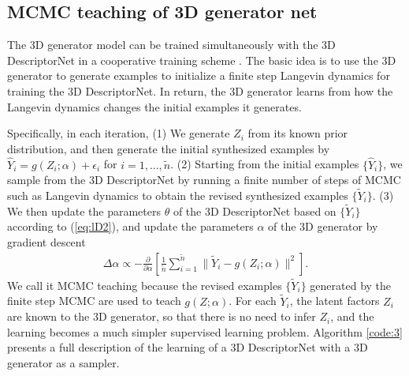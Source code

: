 \documentclass[10pt,twocolumn,letterpaper]{article}
\def\tY{\tilde{Y}}
\def\tn{\tilde{n}}
\def\hY{\hat{Y}}
\begin{document}
\subsection{MCMC teaching of 3D generator net} 

The 3D generator model can be trained simultaneously with the 3D DescriptorNet  in a cooperative training scheme \cite{xie2016cooperative}. The basic idea is to use the 3D generator to generate examples to initialize a finite step Langevin dynamics for training the 3D DescriptorNet. In return, the 3D generator learns from how the Langevin dynamics changes the initial examples it generates. 


 
Specifically, in each iteration, (1) We generate $Z_i$ from its known prior distribution, and then generate the initial synthesized examples  by $\hY_i = g(Z_i; \alpha)  + \epsilon_i$ for $i=1,...,\tilde n$. (2) Starting from the initial examples $\{\hY_i\}$, we sample from the 3D DescriptorNet by running a finite number of steps of MCMC such as Langevin dynamics  to obtain the revised synthesized examples $\{\tY_i\}$. (3) We then update the parameters $\theta$ of the 3D DescriptorNet based on $\{\tY_i\}$ according to (\ref{eq:lD2}), and update the parameters $\alpha$ of the 3D generator by gradient descent 
\begin{eqnarray}
\Delta \alpha \propto - \frac{\partial}{\partial \alpha} \left[\frac{1}{\tn} \sum_{i=1}^{\tilde n} \|\tY_i - g(Z_i; \alpha)\|^2\right]. \label{eq:alpha}
\end{eqnarray}
 We call it MCMC teaching because the revised examples $\{\tY_i\}$ generated by the finite step MCMC are used to teach $g(Z; \alpha)$. 
For each $\tY_i$,  the latent factors $Z_i$ are known to the 3D generator, so that there is no need to infer $Z_i$, and the learning becomes a much simpler supervised learning problem. %
Algorithm \ref{code:3} presents a full description of the learning of a 3D DescriptorNet with a 3D generator as a sampler.   


 
\end{document}
